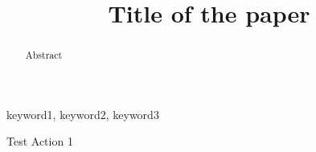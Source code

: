 \documentclass[conference]{IEEEtran}
\begin{document}
\title{Title of the paper
{\footnotesize}
}

\author{
}

\maketitle

\begin{abstract} 
Abstract 
\end{abstract}

\begin{IEEEkeywords}
keyword1, keyword2, keyword3
\end{IEEEkeywords}


Test Action 1


\clearpage
\end{document}
